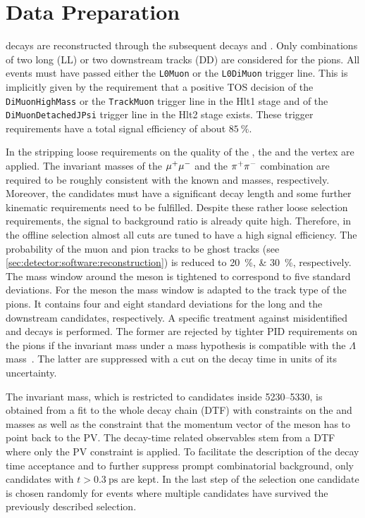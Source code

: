 
\section{Data Preparation}
\label{sec:bd2jpsiks:datapreparation}


\BdToJPsiKS decays are reconstructed through the subsequent decays
\mbox{\JPsiToMuMu} and \KSToPiPi. Only combinations of two long (LL) or two
downstream tracks (DD) are considered for the pions. All events must have passed
either the \texttt{L0Muon} or the \texttt{L0DiMuon} trigger line. This is
implicitly given by the requirement that a positive \jpsi TOS
decision of the \texttt{DiMuonHighMass} or the \texttt{TrackMuon} trigger line
in the Hlt1 stage and of the \texttt{DiMuonDetachedJPsi} trigger line in the
Hlt2 stage exists. These trigger requirements have a total signal efficiency
of about $\SI{85}{\percent}$.

In the stripping loose requirements on the quality of the \jpsi, the \KS and
the \Bd vertex are applied. The invariant masses of the ${\mu^+\mu^-}$ and the
${{\pi}^+}{{\pi}^-}$ combination are required to be roughly consistent with the known
\jpsi and \KS masses, respectively. Moreover, the \KS candidates must have a
significant decay length and some further kinematic requirements need to be
fulfilled. Despite these rather loose selection requirements, the signal to
background ratio is already quite high. Therefore, in the offline selection
almost all cuts are tuned to have a high signal efficiency. The probability of
the muon and pion tracks to be ghost tracks (see
\cref{sec:detector:software:reconstruction}) is reduced to
\SIlist{20;30}{\percent}, respectively. The mass window around the \jpsi meson
is tightened to correspond to five standard deviations. For the \KS meson the
mass window is adapted to the track type of the pions. It contains four and
eight standard deviations for the long and the downstream candidates,
respectively. A specific treatment against misidentified \LbToJPsiL and
\BdToJPsiKstar decays is performed. The former are rejected by tighter PID
requirements on the pions if the invariant mass under a \pion\proton mass
hypothesis is compatible with the $\Lambda$ mass~\cite{PDG2014}. The latter
are suppressed with a cut on the \KS decay time in units of its uncertainty.

The invariant \Bd mass, which is restricted to candidates inside
\SIrange{5230}{5330}{\MeVcc}, is obtained from a fit to the whole decay chain
(DTF) with constraints on the \jpsi and \KS masses as well as the constraint
that the momentum vector of the \Bd meson has to point back to the PV. The
decay-time related observables stem from a DTF where only the PV constraint is
applied. To facilitate the description of the decay time acceptance and to
further suppress prompt combinatorial background, only candidates with $t >
\SI{0.3}{\ps}$ are kept. In the last step of the selection one candidate is
chosen randomly for events where multiple candidates have survived the
previously described selection.

